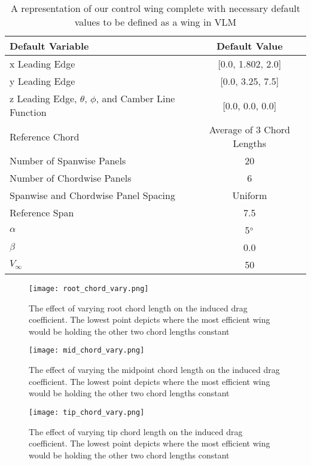 \documentclass{article}
\begin{document}
\begin{table}[H]
    \centering
    \caption{A representation of our control wing complete with necessary default values to be defined as a wing in VLM}\label{tab:defaults}
    \begin{tabular}{l c}
        \toprule
        \textbf{Default Variable} & \textbf{Default Value} \\
        \midrule
        x Leading Edge & [0.0, 1.802, 2.0]\\
        y Leading Edge & [0.0, 3.25, 7.5] \\
        z Leading Edge, $\theta$, $\phi$, and Camber Line Function & [0.0, 0.0, 0.0] \\
        Reference Chord & Average of 3 Chord Lengths \\
        Number of Spanwise Panels & 20 \\
        Number of Chordwise Panels & 6 \\
        Spanwise and Chordwise Panel Spacing & Uniform \\
        Reference Span & 7.5 \\
        $\alpha$ & 5$\degree$ \\
        $\beta$ & 0.0 \\
        $V_{\infty}$ & 50 \\
        \bottomrule
    \end{tabular}
\end{table}


\begin{figure}[H]
    \centering
    \texttt{[image: root\_chord\_vary.png]}
    \caption{The effect of varying root chord length on the induced drag coefficient. The lowest point depicts where the most efficient wing would be holding the other two chord lengths constant}\label{fig:root_chrod}
\end{figure}

\begin{figure}[H]
    \centering
    \texttt{[image: mid\_chord\_vary.png]}
    \caption{The effect of varying the midpoint chord length on the induced drag coefficient. The lowest point depicts where the most efficient wing would be holding the other two chord lengths constant}\label{fig:mid_chrod}
\end{figure}

\begin{figure}[H]
    \centering
    \texttt{[image: tip\_chord\_vary.png]}
    \caption{The effect of varying tip chord length on the induced drag coefficient. The lowest point depicts where the most efficient wing would be holding the other two chord lengths constant}\label{fig:tip_chrod}
\end{figure}


\end{document}

